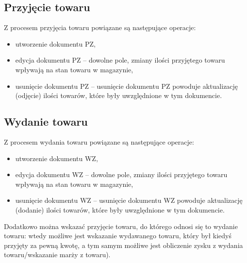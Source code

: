 \subsection{Przyjęcie towaru}
Z procesem przyjęcia towaru powiązane są następujące operacje:
\begin{itemize}
\item utworzenie dokumentu PZ,
\item edycja dokumentu PZ -- dowolne pole, zmiany ilości przyjętego
  towaru wpływają na stan towaru w magazynie,
\item usunięcie dokumentu PZ -- usunięcie dokumentu PZ powoduje
  aktualizację (odjęcie) ilości towarów, które były uwzględnione w tym
  dokumencie.
\end{itemize}

\subsection{Wydanie towaru}
Z procesem wydania towaru powiązane są następujące operacje:
\begin{itemize}
\item utworzenie dokumentu WZ,
\item edycja dokumentu WZ -- dowolne pole, zmiany ilości przyjętego
  towaru wpływają na stan towaru w magazynie,
\item usunięcie dokumentu WZ -- usunięcie dokumentu WZ powoduje
  aktualizację (dodanie) ilości towarów, które były uwzględnione w tym
  dokumencie.
\end{itemize}

Dodatkowo można wskazać przyjęcie towaru, do którego odnosi się to
wydanie towaru: wtedy możliwe jest wskazanie wydawanego towaru, który
był kiedyś przyjęty za pewną kwotę, a tym samym możliwe jest
obliczenie zysku z wydania towaru/wskazanie marży z towaru).

